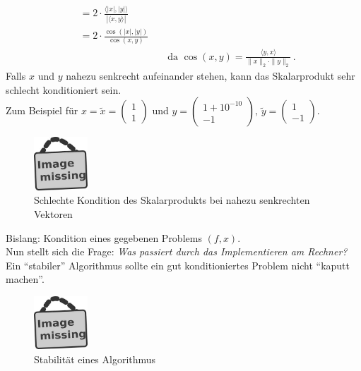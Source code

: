 \begin{Bspe}
\begin{enumerate}[a)]
\begin{align*}
                                                         &= 2\cdot \frac{\langle |x|,|y|\rangle}{|\langle x,y\rangle|} \\
                                                         &= 2 \cdot \frac{\cos(|x|, |y|)}{\cos(x,y)}  \\
                                                         &&&				\text{	da  }\cos(x,y) = \frac{\langle y,x \rangle}{\|x\|_2 \cdot \|y\|_2} \, . 
    \end{align*}
    Falls $x$ und $y$ nahezu senkrecht aufeinander stehen, kann das Skalarprodukt sehr schlecht konditioniert sein. \\
    Zum Beispiel für $x=\widetilde{x} = \begin{pmatrix} 1 \\1 \end{pmatrix}$
    und $y=\begin{pmatrix} 1+10^{-10} \\-1 \end{pmatrix},
    \, \widetilde{y}=\begin{pmatrix} 1 \\-1 \end{pmatrix}$. \\
    \begin{figure}
      \parbox{\linewidth}{
        \centering
        \includegraphics[width=2cm]{images/image_missing.jpg}
      }
      \caption{Schlechte Kondition des Skalarprodukts bei nahezu senkrechten Vektoren}
    \end{figure}
  \end{enumerate}	
\end{Bspe}

Bislang: Kondition eines gegebenen Problems $(f,x)$. \\
Nun stellt sich die Frage: \textit{Was passiert durch das Implementieren am Rechner? }\\
Ein \enquote{stabiler} Algorithmus sollte ein gut konditioniertes Problem nicht \enquote{kaputt machen}.\\

\begin{figure}
  \parbox{\linewidth}{
    \centering
    \includegraphics[width=2cm]{images/image_missing.jpg}
  }
  \caption{Stabilität eines Algorithmus}
\end{figure}

